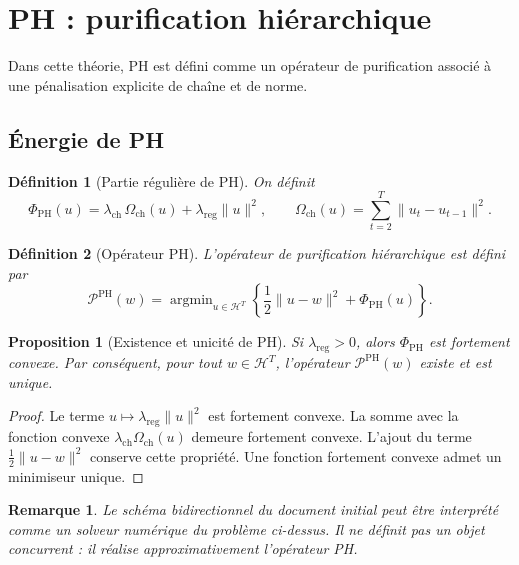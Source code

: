 \documentclass[11pt,a4paper]{article}
\newtheorem{definition}{Définition}[section]
\newtheorem{proposition}{Proposition}[section]
\newtheorem{remark}{Remarque}[section]
\DeclareMathOperator{\argmin}{argmin}
\newcommand{\Hh}{\mathcal H}
\newcommand{\Pcal}{\mathcal P}
\newcommand{\1}{\mathbf 1}
\begin{document}
\section{PH : purification hiérarchique}

Dans cette théorie, PH est défini comme un opérateur de purification associé à une pénalisation explicite de chaîne et de norme.

\subsection{Énergie de PH}

\begin{definition}[Partie régulière de PH]
On définit
\[
\Phi_{\mathrm{PH}}(u)
=
\lambda_{\mathrm{ch}}\,\Omega_{\mathrm{ch}}(u)
+
\lambda_{\mathrm{reg}}\|u\|^2,
\qquad
\Omega_{\mathrm{ch}}(u)=\sum_{t=2}^T\|u_t-u_{t-1}\|^2.
\]
\end{definition}

\begin{definition}[Opérateur PH]
L'opérateur de purification hiérarchique est défini par
\[
\Pcal^{\mathrm{PH}}(w)
=
\argmin_{u\in\Hh^T}
\left\{
\frac12\|u-w\|^2+\Phi_{\mathrm{PH}}(u)
\right\}.
\]
\end{definition}

\begin{proposition}[Existence et unicité de PH]
Si \(\lambda_{\mathrm{reg}}>0\), alors \(\Phi_{\mathrm{PH}}\) est fortement convexe.  
Par conséquent, pour tout \(w\in\Hh^T\), l'opérateur \(\Pcal^{\mathrm{PH}}(w)\) existe et est unique.
\end{proposition}

\begin{proof}
Le terme \(u\mapsto \lambda_{\mathrm{reg}}\|u\|^2\) est fortement convexe.  
La somme avec la fonction convexe \(\lambda_{\mathrm{ch}}\Omega_{\mathrm{ch}}(u)\) demeure fortement convexe.  
L'ajout du terme \(\frac12\|u-w\|^2\) conserve cette propriété.  
Une fonction fortement convexe admet un minimiseur unique.
\end{proof}

\begin{remark}
Le schéma bidirectionnel du document initial peut être interprété comme un solveur numérique du problème ci-dessus.  
Il ne définit pas un objet concurrent : il réalise approximativement l'opérateur PH.
\end{remark}
\end{document}
